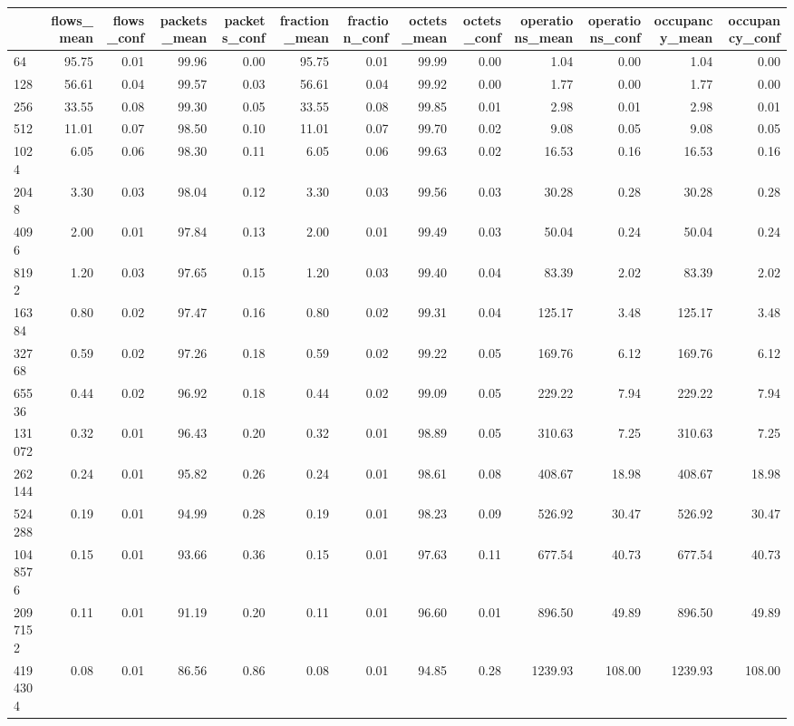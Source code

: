 \begin{tabular}{lrrrrrrrrrrrr}
\toprule
 & flows_mean & flows_conf & packets_mean & packets_conf & fraction_mean & fraction_conf & octets_mean & octets_conf & operations_mean & operations_conf & occupancy_mean & occupancy_conf \\
\midrule
64 & 95.75 & 0.01 & 99.96 & 0.00 & 95.75 & 0.01 & 99.99 & 0.00 & 1.04 & 0.00 & 1.04 & 0.00 \\
128 & 56.61 & 0.04 & 99.57 & 0.03 & 56.61 & 0.04 & 99.92 & 0.00 & 1.77 & 0.00 & 1.77 & 0.00 \\
256 & 33.55 & 0.08 & 99.30 & 0.05 & 33.55 & 0.08 & 99.85 & 0.01 & 2.98 & 0.01 & 2.98 & 0.01 \\
512 & 11.01 & 0.07 & 98.50 & 0.10 & 11.01 & 0.07 & 99.70 & 0.02 & 9.08 & 0.05 & 9.08 & 0.05 \\
1024 & 6.05 & 0.06 & 98.30 & 0.11 & 6.05 & 0.06 & 99.63 & 0.02 & 16.53 & 0.16 & 16.53 & 0.16 \\
2048 & 3.30 & 0.03 & 98.04 & 0.12 & 3.30 & 0.03 & 99.56 & 0.03 & 30.28 & 0.28 & 30.28 & 0.28 \\
4096 & 2.00 & 0.01 & 97.84 & 0.13 & 2.00 & 0.01 & 99.49 & 0.03 & 50.04 & 0.24 & 50.04 & 0.24 \\
8192 & 1.20 & 0.03 & 97.65 & 0.15 & 1.20 & 0.03 & 99.40 & 0.04 & 83.39 & 2.02 & 83.39 & 2.02 \\
16384 & 0.80 & 0.02 & 97.47 & 0.16 & 0.80 & 0.02 & 99.31 & 0.04 & 125.17 & 3.48 & 125.17 & 3.48 \\
32768 & 0.59 & 0.02 & 97.26 & 0.18 & 0.59 & 0.02 & 99.22 & 0.05 & 169.76 & 6.12 & 169.76 & 6.12 \\
65536 & 0.44 & 0.02 & 96.92 & 0.18 & 0.44 & 0.02 & 99.09 & 0.05 & 229.22 & 7.94 & 229.22 & 7.94 \\
131072 & 0.32 & 0.01 & 96.43 & 0.20 & 0.32 & 0.01 & 98.89 & 0.05 & 310.63 & 7.25 & 310.63 & 7.25 \\
262144 & 0.24 & 0.01 & 95.82 & 0.26 & 0.24 & 0.01 & 98.61 & 0.08 & 408.67 & 18.98 & 408.67 & 18.98 \\
524288 & 0.19 & 0.01 & 94.99 & 0.28 & 0.19 & 0.01 & 98.23 & 0.09 & 526.92 & 30.47 & 526.92 & 30.47 \\
1048576 & 0.15 & 0.01 & 93.66 & 0.36 & 0.15 & 0.01 & 97.63 & 0.11 & 677.54 & 40.73 & 677.54 & 40.73 \\
2097152 & 0.11 & 0.01 & 91.19 & 0.20 & 0.11 & 0.01 & 96.60 & 0.01 & 896.50 & 49.89 & 896.50 & 49.89 \\
4194304 & 0.08 & 0.01 & 86.56 & 0.86 & 0.08 & 0.01 & 94.85 & 0.28 & 1239.93 & 108.00 & 1239.93 & 108.00 \\

\end{tabular}
